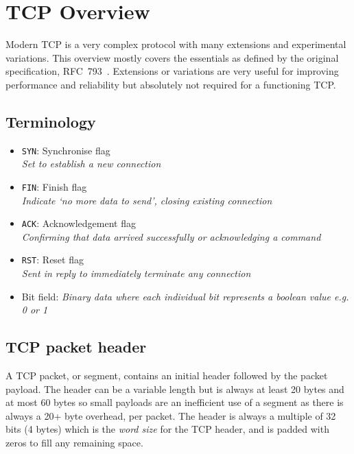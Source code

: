 
\section{TCP Overview}
    Modern TCP is a very complex protocol with many extensions and experimental variations. This overview mostly covers the essentials as defined by the original specification, RFC~793~\cite{rfc793}. Extensions or variations are very useful for improving performance and reliability but absolutely not required for a functioning TCP. %

    \subsection{Terminology}
        \begin{itemize}
            \item \texttt{SYN}: Synchronise flag\\
                \textit{Set to establish a new connection}
            \item \texttt{FIN}: Finish flag\\
                \textit{Indicate `no more data to send', closing existing connection}
            \item \texttt{ACK}: Acknowledgement flag\\
                \textit{Confirming that data arrived successfully or acknowledging a command}
            \item \texttt{RST}: Reset flag\\
                \textit{Sent in reply to immediately terminate any connection}
            \item Bit field: \textit{Binary data where each individual bit represents a boolean value e.g. 0 or 1}
        \end{itemize}

    \subsection{TCP packet header}
        A TCP packet, or segment, contains an initial header followed by the packet payload. The header can be a variable length but is always at least 20 bytes and at most 60 bytes so small payloads are an inefficient use of a segment as there is always a 20+ byte overhead, per packet. The header is always a multiple of 32 bits (4 bytes) which is the \textit{word size} for the TCP header, and is padded with zeros to fill any remaining space.

